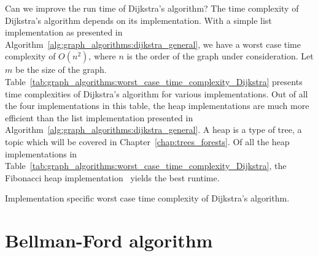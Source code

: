 Can we improve the run time of Dijkstra's
algorithm? The time complexity of
Dijkstra's algorithm depends on its implementation. With a simple
list implementation as presented in
Algorithm~\ref{alg:graph_algorithms:dijkstra_general}, we have a worst
case time complexity of $O(n^2)$, where $n$ is the order of the graph
under consideration. Let $m$ be the size of the
graph. Table~\ref{tab:graph_algorithms:worst_case_time_complexity_Dijkstra}
presents time complexities of Dijkstra's algorithm for various
implementations. Out of all the four implementations in this table,
the heap implementations are much more efficient than the list
implementation presented in
Algorithm~\ref{alg:graph_algorithms:dijkstra_general}. A heap is a type
of tree, a topic which will be covered in
Chapter~\ref{chap:trees_forests}. Of all the heap implementations in
Table~\ref{tab:graph_algorithms:worst_case_time_complexity_Dijkstra},
the Fibonacci heap
implementation~\cite{FredmanTarjan1987} yields the best runtime.

\begin{table}[!htbp]
\centering
{}

\caption{Implementation specific worst case time complexity of
  Dijkstra's algorithm.}
\label{tab:graph_algorithms:worst_case_time_complexity_Dijkstra}
\end{table}



\section{Bellman-Ford algorithm}


